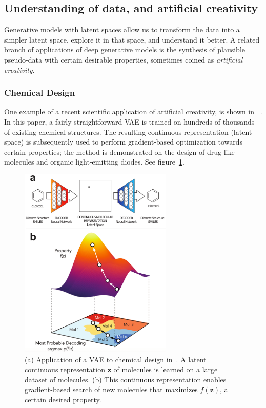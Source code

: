 \documentclass[MAL,biber]{nowfnt} %
\newcommand{\bb}[1]{\mathbf{#1}}
\newcommand{\bz}{\bb{z}}
\begin{document}
\subsection{Understanding of data, and artificial creativity}

Generative models with latent spaces allow us to transform the data into a simpler latent space, explore it in that space, and understand it better. A related branch of applications of deep generative models is the synthesis of plausible pseudo-data with certain desirable properties, sometimes coined as \emph{artificial creativity}.

\subsubsection{Chemical Design}
One example of a recent scientific application of artificial creativity, is shown in ~\cite{gomez2016automatic}. In this paper, a fairly straightforward VAE is trained on hundreds of thousands of existing chemical structures. The resulting continuous representation (latent space) is subsequently used to perform gradient-based optimization towards certain properties; the method is demonstrated on the design of drug-like molecules and organic light-emitting diodes. See figure~\ref{fig:molecules}.

\begin{figure}
	\centering
	\includegraphics[width=0.65\textwidth]{figures/molecules.png}
	\caption{(a) Application of a VAE to chemical design in~\citep{gomez2016automatic}. A latent continuous representation $\bz$ of molecules is learned on a large dataset of molecules. (b) This continuous representation enables gradient-based search of new molecules that maximizes $f(\bz)$, a certain desired property.}
	\label{fig:molecules}
\end{figure}
\end{document}
